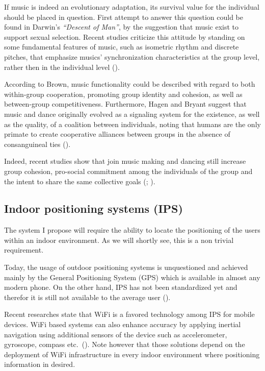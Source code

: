 \documentclass[a4paper,11pt]{article}
\begin{document}
If music is indeed an evolutionary adaptation, its survival value for the individual should be placed in question.
First attempt to answer this question could be found in Darwin's \textit{``Descent of Man''}, by the suggestion that music exist to support sexual selection.
Recent studies criticize this attitude by standing on some fundamental features of music, such as isometric rhythm and discrete pitches, that emphasize musics' synchronization characteristics at the group level, rather then in the individual level (\cite{Brown2000}).

According to Brown, music functionality could be described with regard to both within-group cooperation, promoting group identity and cohesion, as well as between-group competitiveness.
Furthermore, Hagen and Bryant suggest that music and dance originally evolved as a signaling system for the existence, as well as the quality, of a coalition between individuals, noting that humans are the only primate to create cooperative alliances between groups in the absence of consanguineal ties (\cite*{Hagen2003}).

Indeed, recent studies show that join music making and dancing still increase group cohesion, pro-social commitment among the individuals of the group and the intent to share the same collective goals (\cite{Kirschner2010}; \cite{Knoblich2011}).

\subsection{Indoor positioning systems (IPS)}

The system I propose will require the ability to locate the positioning of the users within an indoor environment.
As we will shortly see, this is a non trivial requirement.

Today, the usage of outdoor positioning systems is unquestioned and achieved mainly by the General Positioning System (GPS) which is available in almost any modern phone.
On the other hand, IPS has not been standardized yet and therefor it is still not available to the average user (\cite{web:turetsky}).

Recent researches state that WiFi is a favored technology among IPS for mobile devices.
WiFi based systems can also enhance accuracy by applying inertial navigation using additional sensors of the device such as accelerometer, gyroscope, compass etc.\ (\cite{web:harrop}).
Note however that those solutions depend on the deployment of WiFi infrastructure in every indoor environment where positioning information in desired.
\end{document}
